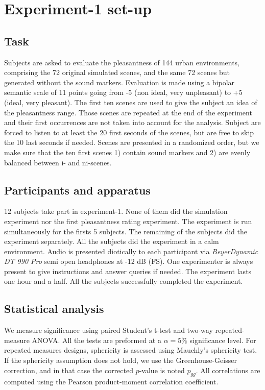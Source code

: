 \documentclass[twoside,twocolumn]{article}
\begin{document}
\section{Experiment-1 set-up}
\subsection{Task}

Subjects are asked to evaluate the pleasantness of 144 urban environments, comprising the 72 original simulated scenes, and the same 72 scenes but generated without the sound markers. Evaluation is made using a bipolar semantic scale of 11 points going from -5 (non ideal, very unpleasant) to +5 (ideal, very pleasant). The first ten scenes are used to give the subject an idea of the pleasantness range. Those scenes are repeated at the end of the experiment and their first occurrences are not taken into account for the analysis. Subject are forced to listen to at least the 20 first seconds of the scenes, but are free to skip the 10 last seconds if needed. Scenes are presented in a randomized order, but we make sure that the ten first scenes 1) contain sound markers and 2) are evenly balanced between i- and ni-scenes.

\subsection{Participants and apparatus}

12 subjects take part in experiment-1. None of them did the simulation experiment nor the first pleasantness rating experiment. The experiment is run simultaneously for the firsts 5 subjects.  The remaining of the subjects did the experiment separately. All the subjects did the experiment in a calm environment. Audio is presented diotically to each participant via \textit{BeyerDynamic DT 990 Pro} semi open headphones at -12 dB (FS). One experimenter is always present to give instructions and answer queries if needed. The experiment lasts one hour and a half. All the subjects successfully completed the experiment. 

\subsection{Statistical analysis}

We measure significance using paired Student's t-test and two-way repeated-measure ANOVA. All the tests are preformed at a $\alpha=5\%$ significance level. For repeated measures designs, sphericity is assessed using Mauchly's sphericity test. If the sphericity assumption does not hold, we use the Greenhouse-Geisser correction, and in that case the corrected $p$-value is noted $p_{gg}$. All correlations are computed using the Pearson product-moment correlation coefficient.
\end{document}

